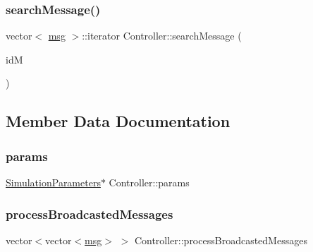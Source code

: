 \mbox{\label{classController_aa32d5c18e9e30caf2900527e42b93d44}} 
\subsubsection{\texorpdfstring{search\+Message()}{searchMessage()}}
{\footnotesize\ttfamily vector$<$ \hyperlink{Controller_8h_afa0f3b802fbc219228f7bb97996fa558}{msg} $>$\+::iterator Controller\+::search\+Message (\begin{DoxyParamCaption}\item[{\hyperlink{structures_8h_a83a1d9a070efa5341da84cfd8e28d3e5}{id\+Msg}}]{idM }\end{DoxyParamCaption})\hspace{0.3cm}{\ttfamily [private]}}



\subsection{Member Data Documentation}
\mbox{\label{classController_a81d7fe43b78ef7601e6b36c3df38ce79}} 
\subsubsection{\texorpdfstring{params}{params}}
{\footnotesize\ttfamily \hyperlink{classSimulationParameters}{Simulation\+Parameters}$\ast$ Controller\+::params\hspace{0.3cm}{\ttfamily [private]}}

\mbox{\label{classController_ae96146dee6f60ecd94bfe40b9fc658ad}} 
\subsubsection{\texorpdfstring{process\+Broadcasted\+Messages}{processBroadcastedMessages}}
{\footnotesize\ttfamily vector$<$vector$<$\hyperlink{Controller_8h_afa0f3b802fbc219228f7bb97996fa558}{msg}$>$ $>$ Controller\+::process\+Broadcasted\+Messages\hspace{0.3cm}{\ttfamily [private]}}

